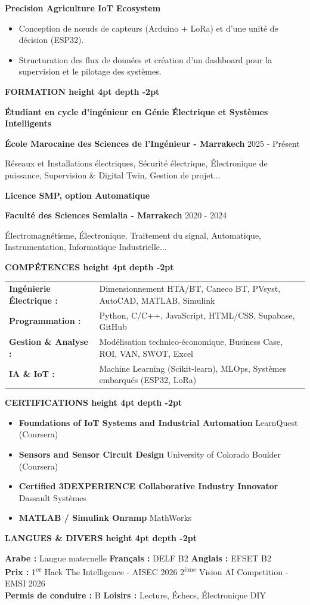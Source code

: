 \documentclass[10pt,a4paper]{../../altacv}
\renewcommand{\cvsection}[2][]{%
  \medskip%
  {\color{heading}\LARGE\bfseries #2 \hspace{0.2em}\leaders\vrule height 4pt depth -2pt\hfill\mbox{}}\par\smallskip
}
\renewcommand{\cvevent}[4]{%
  {\large\bfseries\color{accent}#1\par}
  \smallskip\normalsize
  \ifstrequal{#2}{}{}{%
    \textbf{\color{emphasis}#2\ifstrequal{#4}{}{}{ - #4}}%
  }%
  \hfill
  \ifstrequal{#3}{}{}{{\small#3}}%
  \par\smallskip
}
\begin{document}
{\large\bfseries\color{accent} Precision Agriculture IoT Ecosystem}\\[0.05cm]
\begin{itemize}
  \item Conception de nœuds de capteurs (Arduino + LoRa) et d'une unité de décision (ESP32).
  \item Structuration des flux de données et création d'un dashboard pour la supervision et le pilotage des systèmes.
\end{itemize}

\cvsection{FORMATION}
\cvevent{Étudiant en cycle d'ingénieur en Génie Électrique et Systèmes Intelligents}{École Marocaine des Sciences de l'Ingénieur}{2025 - Présent}{Marrakech}
\small Réseaux et Installations électriques, Sécurité électrique, Électronique de puissance, Supervision \& Digital Twin, Gestion de projet...

\cvevent{Licence SMP, option Automatique}{Faculté des Sciences Semlalia}{2020 - 2024}{Marrakech}
\small Électromagnétisme, Électronique, Traitement du signal, Automatique, Instrumentation, Informatique Industrielle...

\cvsection{COMPÉTENCES}
\begin{tabular}{@{}ll@{}}
\textbf{Ingénierie Électrique :} & Dimensionnement HTA/BT, Caneco BT, PVsyst, AutoCAD, MATLAB, Simulink \\[1pt]
\textbf{Programmation :} & Python, C/C++, JavaScript, HTML/CSS, Supabase, GitHub \\[1pt]
\textbf{Gestion \& Analyse :} & Modélisation technico-économique, Business Case, ROI, VAN, SWOT, Excel \\[1pt]
\textbf{IA \& IoT :} & Machine Learning (Scikit-learn), MLOps, Systèmes embarqués (ESP32, LoRa) \\
\end{tabular}

\cvsection{CERTIFICATIONS}
\begin{itemize}[leftmargin=*, label=\textbullet, itemsep=2pt]
  \item \textbf{Foundations of IoT Systems and Industrial Automation} \hfill {\color{emphasis}LearnQuest (Coursera)}
  \item \textbf{Sensors and Sensor Circuit Design} \hfill {\color{emphasis}University of Colorado Boulder (Coursera)}
  \item \textbf{Certified 3DEXPERIENCE Collaborative Industry Innovator} \hfill {\color{emphasis}Dassault Systèmes}
  \item \textbf{MATLAB / Simulink Onramp} \hfill {\color{emphasis}MathWorks}
\end{itemize}

\cvsection{LANGUES \& DIVERS}
\textbf{Arabe :} Langue maternelle \hfill \textbf{Français :} DELF B2 \hfill \textbf{Anglais :} EFSET B2\\[2pt]
\textbf{Prix :} 1\textsuperscript{er} Hack The Intelligence - AISEC 2026 \hfill 2\textsuperscript{ème} Vision AI Competition - EMSI 2026\\[2pt]
\textbf{Permis de conduire :} B \hfill \textbf{Loisirs :} Lecture, Échecs, Électronique DIY
\end{document}
